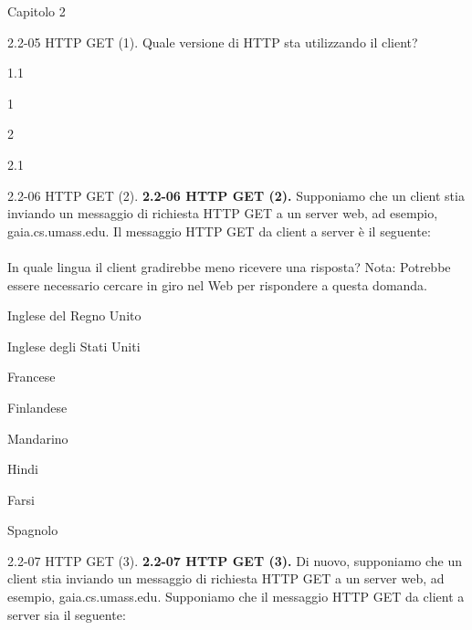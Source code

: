 \documentclass[a4paper]{article}
\begin{document}
\begin{quiz}{Capitolo 2}
\begin{multi}[points=1,shuffle]{2.2-05 HTTP GET (1).}
Quale versione di HTTP sta utilizzando il client?
\item* 1.1
\item 1
\item 2
\item 2.1
\end{multi}
            

\begin{multi}[points=1,shuffle]{2.2-06 HTTP GET (2).}
\textbf{2.2-06 HTTP GET (2).}
Supponiamo che un client stia inviando un messaggio di richiesta HTTP GET a un server web, ad esempio, gaia.cs.umass.edu. Il messaggio HTTP GET da client a server è il seguente: \\

\\

In quale lingua il client gradirebbe meno ricevere una risposta?
Nota: Potrebbe essere necessario cercare in giro nel Web per rispondere a questa domanda.
\item* Inglese del Regno Unito
\item Inglese degli Stati Uniti
\item Francese
\item Finlandese
\item Mandarino
\item Hindi
\item Farsi
\item Spagnolo
\end{multi}

\begin{multi}[points=1,shuffle]{2.2-07 HTTP GET (3).}
\textbf{2.2-07 HTTP GET (3).}
Di nuovo, supponiamo che un client stia inviando un messaggio di richiesta HTTP GET a un server web, ad esempio, gaia.cs.umass.edu. Supponiamo che il messaggio HTTP GET da client a server sia il seguente: \\


\end{multi}
\end{quiz}
\end{document}
